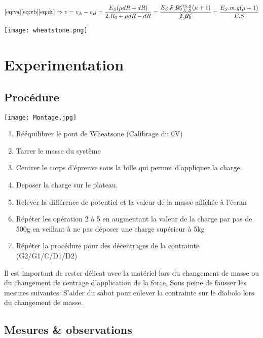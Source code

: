 \documentclass[10pt,a4paper]{report}
\begin{document}
\begin{equation}
\eqref{eq:va} \eqref{eq:vb} \eqref{eq:dr} \Rightarrow v = v_{A} - v_{B} = \dfrac{E_{S}(\mu dR+dR)}{2.R_{0}+\mu dR -dR} = \dfrac{E_{S}.\cancel{k}.\cancel{R_{0}}\frac{m.g}{E.S}(\mu+1)}{\cancel{2}.\cancel{R_{0}}} = \frac{E_{S}.m.g (\mu + 1)}{E.S}
\end{equation}
\begin{center}
\texttt{[image: wheatstone.png]}
\end{center}
\chapter{Experimentation}

\section{Procédure}
\begin{center}
\texttt{[image: Montage.jpg]}
\end{center}
\begin{enumerate}
\item Rééquilibrer le pont de Wheatsone (Calibrage du 0V)
\item Tarrer le masse du système									
\item Centrer le corps d'épreuve sous la bille qui permet d'appliquer la charge.
\item Deposer la charge sur le plateau.
\item Relever la différence de potentiel  et la valeur de la masse affichée à l'écran
\item Répéter les opération 2 à 5 en augmentant la valeur de la charge par pas de 500g en veillant à ne pas déposer une charge supérieur à 5kg
\item Répéter la procédure pour des décentrages de la contrainte (G2/G1/C/D1/D2)
\end{enumerate} 


Il est important de rester délicat avec la matériel lors du changement de masse ou du changement de centrage d'application de la force, Sous peine de fausser les mesures suivantes. S'aider du sabot pour enlever la contrainte sur le diabolo lors du changement de masse.
\newpage
\section{Mesures \& observations}
\end{document}
